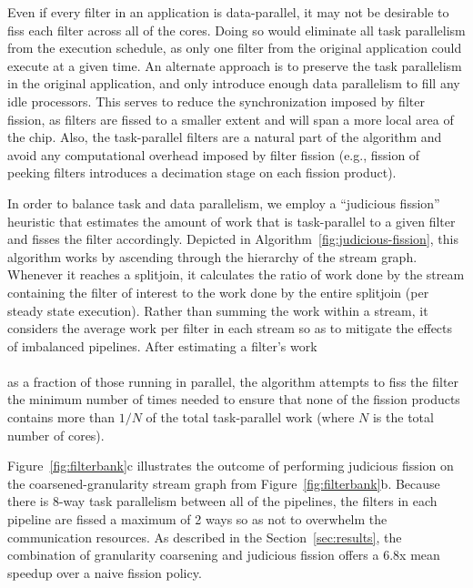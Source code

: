 Even if every filter in an application is data-parallel, it may not be
desirable to fiss each filter across all of the cores.  Doing so would
eliminate all task parallelism from the execution schedule, as only
one filter from the original application could execute at a given
time.  An alternate approach is to preserve the task parallelism in
the original application, and only introduce enough data parallelism
to fill any idle processors.  This serves to reduce the
synchronization imposed by filter fission, as filters are fissed to a
smaller extent and will span a more local area of the chip.  Also, the
task-parallel filters are a natural part of the algorithm and avoid
any computational overhead imposed by filter fission (e.g., fission of
peeking filters introduces a decimation stage on each fission
product).

In order to balance task and data parallelism, we employ a ``judicious
fission'' heuristic that estimates the amount of work that is
task-parallel to a given filter and fisses the filter accordingly.
Depicted in Algorithm~\ref{fig:judicious-fission}, this algorithm
works by ascending through the hierarchy of the stream graph.
Whenever it reaches a splitjoin, it calculates the ratio of work done
by the stream containing the filter of interest to the work done by
the entire splitjoin (per steady state execution).  Rather than
summing the work within a stream, it considers the average work per
filter in each stream so as to mitigate the effects of imbalanced
pipelines.
After estimating a filter's work 
%
\\\vspace{-24pt} ~ \\ as a fraction of those running in parallel, the
algorithm attempts to fiss the filter the minimum number of times
needed to ensure that none of the fission products contains more than
$1/N$ of the total task-parallel work (where $N$ is the total number
of cores).

Figure~\ref{fig:filterbank}c illustrates the outcome of performing
judicious fission on the coarsened-granularity stream graph from
Figure~\ref{fig:filterbank}b.  Because there is 8-way task parallelism
between all of the pipelines, the filters in each pipeline are fissed
a maximum of 2 ways so as not to overwhelm the communication
resources.  As described in the Section~\ref{sec:results}, the
combination of granularity coarsening and judicious fission offers a
6.8x mean speedup over a naive fission policy.
